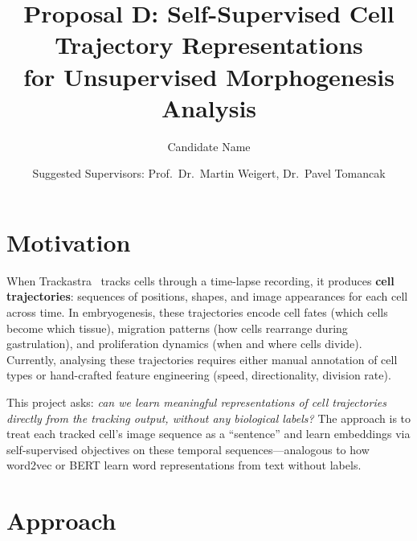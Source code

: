 \documentclass{article}
\title{Proposal D: Self-Supervised Cell Trajectory Representations\\for Unsupervised Morphogenesis Analysis}
\author{Candidate Name}
\date{Suggested Supervisors: Prof.\ Dr.\ Martin Weigert, Dr.\ Pavel Tomancak}
\begin{document}
\maketitle

\section*{Motivation}

When Trackastra~\cite{trackastra} tracks cells through a time-lapse recording, it produces \textbf{cell trajectories}: sequences of positions, shapes, and image appearances for each cell across time. In embryogenesis, these trajectories encode cell fates (which cells become which tissue), migration patterns (how cells rearrange during gastrulation), and proliferation dynamics (when and where cells divide). Currently, analysing these trajectories requires either manual annotation of cell types or hand-crafted feature engineering (speed, directionality, division rate).

This project asks: \emph{can we learn meaningful representations of cell trajectories directly from the tracking output, without any biological labels?} The approach is to treat each tracked cell's image sequence as a ``sentence'' and learn embeddings via self-supervised objectives on these temporal sequences---analogous to how word2vec or BERT learn word representations from text without labels.

\section*{Approach}
\end{document}
